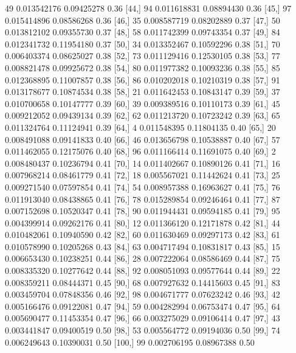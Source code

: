 \documentclass{article}
\begin{document}
\begin{Schunk}
\begin{Soutput}
 [43,]     49 0.013542176 0.09425278   0.36
 [44,]     94 0.011618831 0.08894430   0.36
 [45,]     97 0.015414896 0.08586268   0.36
 [46,]     35 0.008587719 0.08202889   0.37
 [47,]     50 0.013812102 0.09355730   0.37
 [48,]     58 0.011742399 0.09743354   0.37
 [49,]     84 0.012341732 0.11954180   0.37
 [50,]     34 0.013352467 0.10592296   0.38
 [51,]     70 0.006403374 0.08625027   0.38
 [52,]     73 0.011129416 0.12530105   0.38
 [53,]     77 0.008821478 0.09925672   0.38
 [54,]     80 0.011977382 0.10093236   0.38
 [55,]     85 0.012368895 0.11007857   0.38
 [56,]     86 0.010202018 0.10210319   0.38
 [57,]     91 0.013178677 0.10874534   0.38
 [58,]     21 0.011642453 0.10843147   0.39
 [59,]     37 0.010700658 0.10147777   0.39
 [60,]     39 0.009389516 0.10110173   0.39
 [61,]     45 0.009212052 0.09439134   0.39
 [62,]     62 0.011213720 0.10723242   0.39
 [63,]     65 0.011324764 0.11124941   0.39
 [64,]      4 0.011548395 0.11804135   0.40
 [65,]     20 0.008491088 0.09141833   0.40
 [66,]     46 0.013656798 0.10538887   0.40
 [67,]     57 0.011462055 0.12175076   0.40
 [68,]     96 0.011166414 0.11691075   0.40
 [69,]      2 0.008480437 0.10236794   0.41
 [70,]     14 0.011402667 0.10890126   0.41
 [71,]     16 0.007968214 0.08461779   0.41
 [72,]     18 0.005567021 0.11442624   0.41
 [73,]     25 0.009271540 0.07597854   0.41
 [74,]     54 0.008957388 0.16963627   0.41
 [75,]     76 0.011913040 0.08438865   0.41
 [76,]     78 0.015289854 0.09246464   0.41
 [77,]     87 0.007152698 0.10520347   0.41
 [78,]     90 0.011944431 0.09594185   0.41
 [79,]     95 0.004399914 0.09262176   0.41
 [80,]     12 0.011366120 0.12171878   0.42
 [81,]     44 0.010482061 0.10940590   0.42
 [82,]     60 0.011630469 0.09297173   0.42
 [83,]     61 0.010578990 0.10205268   0.43
 [84,]     63 0.004717494 0.10831817   0.43
 [85,]     15 0.006653430 0.10238251   0.44
 [86,]     28 0.007222064 0.08586469   0.44
 [87,]     75 0.008335320 0.10277642   0.44
 [88,]     92 0.008051093 0.09577644   0.44
 [89,]     22 0.008359211 0.08444371   0.45
 [90,]     68 0.007927632 0.14415603   0.45
 [91,]     83 0.003459704 0.07848356   0.46
 [92,]     98 0.004671777 0.07623242   0.46
 [93,]     42 0.005166476 0.09122081   0.47
 [94,]     59 0.004282994 0.06753474   0.47
 [95,]     64 0.005690477 0.11453354   0.47
 [96,]     66 0.003275029 0.09106414   0.47
 [97,]     43 0.003441847 0.09400519   0.50
 [98,]     53 0.005564772 0.09194036   0.50
 [99,]     74 0.006249643 0.10390031   0.50
[100,]     99 0.002706195 0.08967388   0.50
\end{Soutput}
\end{Schunk}
\end{document}
